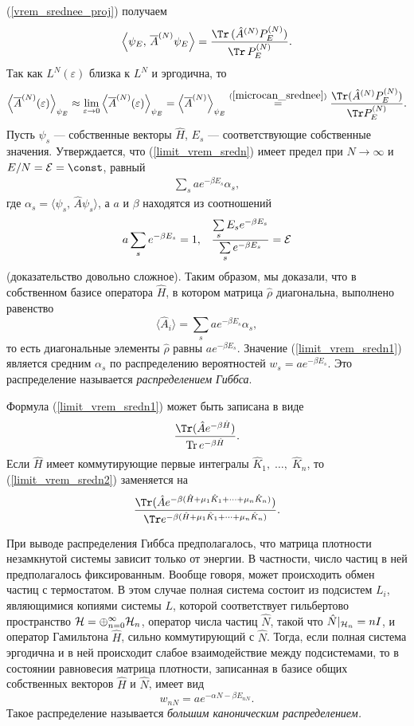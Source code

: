 \documentclass[a4paper
]{article}
\begin{document}
(\ref{vrem_srednee_proj}) получаем
\begin{align}
\label{microcan_srednee}
\left\langle \psi_E, \, \overline A^{(N)}\psi_E\right\rangle=
\frac{\Tr\, (\hat A^{(N)}P_E^{(N)})}{\Tr\, P_E^{(N)}}.
\end{align}
Так как $L^N(\varepsilon)$ близка к $L^N$ и эргодична, то
\begin{align}
\label{limit_vrem_sredn}
\left\langle\overline A^{(N)}(\varepsilon)\right\rangle_{\psi_E}\approx
\lim _{\varepsilon \rightarrow 0}\left\langle\overline A^{(N)}(\varepsilon)
\right\rangle_{\psi_E}=\left\langle\overline A^{(N)}\right\rangle
_{\psi_E}\stackrel{(\ref{microcan_srednee})}{=}\frac{\Tr (\hat A^{(N)}
P_E^{(N)})}{\Tr P_E^{(N)}}.
\end{align}
Пусть $\psi_s$ --- собственные векторы $\hat H$, $E_s$ ---
соответствующие собственные значения. Утверждается, что
(\ref{limit_vrem_sredn}) имеет предел при $N\rightarrow \infty$ и
$E/N={\cal E}=\const$, равный
\begin{align}
\label{limit_vrem_sredn1}
\sum \limits_s ae^{-\beta E_s}\alpha_s,
\end{align}
где $\alpha_s=\langle \psi_s, \, \hat A\psi_s\rangle$, а $a$ и $\beta$
находятся из соотношений
$$a\sum \limits_s e^{-\beta E_s}=1, \; \;\; \frac{\sum \limits_s E_s e^{-\beta
E_s}}{\sum \limits _s e^{-\beta E_s}}={\cal E}$$ (доказательство довольно
сложное). Таким образом, мы доказали, что в собственном базисе оператора
$\hat H$, в котором матрица $\hat \rho$ диагональна, выполнено
равенство $$\langle \hat A_i\rangle=\sum \limits_s ae^{-\beta E_s}\alpha_s,$$
то есть диагональные элементы $\hat \rho$ равны $ae^{-\beta E_s}$.
Значение (\ref{limit_vrem_sredn1}) является средним $\alpha_s$
по распределению вероятностей $w_s=ae^{-\beta E_s}$. Это
распределение называется {\it распределением Гиббса}. \par
Формула (\ref{limit_vrem_sredn1}) может быть записана в виде
\begin{align}
\label{limit_vrem_sredn2}
\frac{\Tr (\hat A e^{-\beta \hat H})}{{\rm Tr}\, e^{-\beta \hat H}}.
\end{align}
Если $\hat H$ имеет коммутирующие первые интегралы $\hat K_1, \; \dots, \;
\hat K_n$, то (\ref{limit_vrem_sredn2}) заменяется на $$\frac{\Tr (\hat A
e^{-\beta (\hat H+\mu_1 \hat K_1+\dots+\mu_n \hat K_n)})}{\Tr e^{-\beta
(\hat H+\mu_1\hat K_1+\dots+\mu_n\hat K_n)}}.$$
\par
При выводе распределения Гиббса предполагалось, что матрица плотности
незамкнутой системы зависит только от энергии. В частности, число
частиц в ней предполагалось фиксированным. Вообще говоря, может происходить
обмен частиц с термостатом. В этом случае полная система состоит из
подсистем $L_i$, являющимися копиями системы $L$, которой соответствует
гильбертово пространство ${\cal H}=\oplus _{n=0}^\infty {\cal H}_n$,
оператор числа частиц $\hat N$, такой что $\hat N|_{{\cal H}_n}=nI$,
и оператор Гамильтона $\hat H$, сильно коммутирующий с $\hat N$. Тогда,
если полная система эргодична и в ней происходит слабое взаимодействие
между подсистемами, то в состоянии равновесия матрица плотности,
записанная в базисе общих собственных векторов $\hat H$ и $\hat N$,
имеет вид $$w_{nN}=ae^{-\alpha N-\beta E_{nN}}.$$ Такое распределение
называется {\it большим каноническим распределением.}
\end{document}
